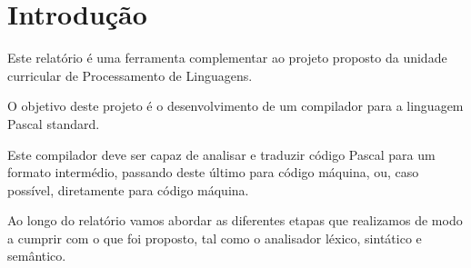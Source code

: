 \chapter{Introdução}

Este relatório é uma ferramenta complementar ao projeto proposto da unidade curricular de Processamento de Linguagens.

O objetivo deste projeto é o desenvolvimento de um compilador para a linguagem Pascal standard.

Este compilador deve ser capaz de analisar e traduzir código Pascal para um formato intermédio, passando deste último para código máquina, ou, caso possível, diretamente para código máquina.

Ao longo do relatório vamos abordar as diferentes etapas que realizamos de modo a cumprir com o que foi proposto, tal como o analisador léxico, sintático e semântico.
